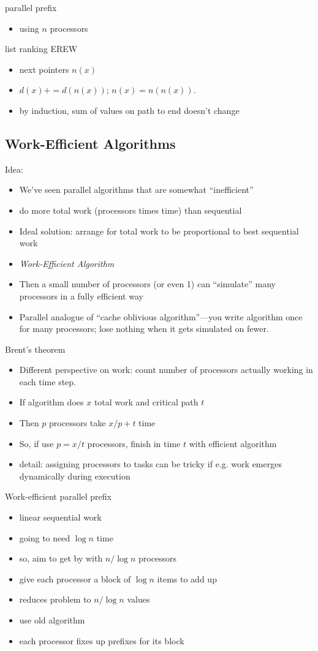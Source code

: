 \documentclass[12pt]{article}
\begin{document}
parallel prefix
\begin{itemize}
\item using $n$ processors
\end{itemize}

list ranking EREW
\begin{itemize}
\item next pointers $n(x)$
\item $d(x)+=d(n(x))$; $n(x)=n(n(x))$.
\item by induction, sum of values on path to end doesn't change
\end{itemize}

\subsection{Work-Efficient Algorithms}

Idea: 
\begin{itemize}
\item We've seen parallel algorithms that are somewhat ``inefficient''
\item do more total work  (processors times time) than sequential
\item Ideal solution: arrange for total work to be
  proportional to best sequential work
\item \emph{Work-Efficient Algorithm}
\item Then a small number of  processors (or even 1) can ``simulate''
  many processors in a fully efficient way
\item Parallel analogue of ``cache oblivious algorithm''---you write
  algorithm once for many processors; lose nothing when it gets
  simulated on fewer.
\end{itemize}


Brent's theorem
\begin{itemize}
\item Different perspective on work: count number of processors actually
working in each time step.
\item If algorithm does $x$ total work and critical path $t$
\item Then $p$ processors take $x/p+t$ time
\item So, if use $p=x/t$ processors, finish in time $t$ with efficient
  algorithm
\item detail: assigning processors to tasks can be tricky if e.g. work
  emerges dynamically during execution
\end{itemize}

Work-efficient parallel prefix
\begin{itemize}
\item linear sequential work
\item going to need $\log n$ time
\item so, aim to get by with $n/\log n$ processors
\item give each processor a block of $\log n$ items to add up
\item reduces problem to $n/\log n$ values
\item use old algorithm
\item each processor fixes up prefixes for its block
\end{itemize}
\end{document}
